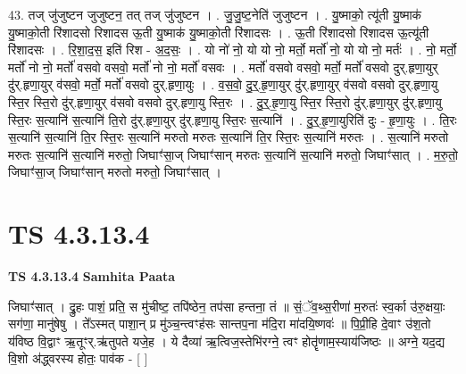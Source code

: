 \documentclass[17pt]{extarticle}
\begin{document}
43. तज् जु॑जुष्टन जुजुष्टन॒ तत् तज् जु॑जुष्टन । . जु॒जु॒ष्ट॒नेति॑ जुजुष्टन । . यु॒ष्माको॒ त्यू॑ती यु॒ष्माक॑ यु॒ष्माको॒ती रि॑शादसो रिशादस ऊ॒ती यु॒ष्माक॑ यु॒ष्माको॒ती रि॑शादसः । . ऊ॒ती रि॑शादसो रिशादस ऊ॒त्यू॑ती रि॑शादसः । . रि॒शा॒द॒स॒ इति॑ रिश - अ॒द॒सः॒ । . यो नो॑ नो॒ यो यो नो॒ मर्तो॒ मर्तो॑ नो॒ यो यो नो॒ मर्तः॑ । . नो॒ मर्तो॒ मर्तो॑ नो नो॒ मर्तो॑ वसवो वसवो॒ मर्तो॑ नो नो॒ मर्तो॑ वसवः । . मर्तो॑ वसवो वसवो॒ मर्तो॒ मर्तो॑ वसवो दुर्.हृणा॒युर् दु॑र्.हृणा॒युर् व॑सवो॒ मर्तो॒ मर्तो॑ वसवो दुर्.हृणा॒युः । . व॒स॒वो॒ दु॒र्॒.हृ॒णा॒युर् दु॑र्.हृणा॒युर् व॑सवो वसवो दुर्.हृणा॒यु स्ति॒र स्ति॒रो दु॑र्.हृणा॒युर् व॑सवो वसवो दुर्.हृणा॒यु स्ति॒रः । . दु॒र्॒.हृ॒णा॒यु स्ति॒र स्ति॒रो दु॑र्.हृणा॒युर् दु॑र्.हृणा॒यु स्ति॒रः स॒त्यानि॑ स॒त्यानि॑ ति॒रो दु॑र्.हृणा॒युर् दु॑र्.हृणा॒यु स्ति॒रः स॒त्यानि॑ । . दु॒र्॒.हृ॒णा॒युरिति॑ दुः - हृ॒णा॒युः । . ति॒रः स॒त्यानि॑ स॒त्यानि॑ ति॒र स्ति॒रः स॒त्यानि॑ मरुतो मरुतः स॒त्यानि॑ ति॒र स्ति॒रः स॒त्यानि॑ मरुतः । . स॒त्यानि॑ मरुतो मरुतः स॒त्यानि॑ स॒त्यानि॑ मरुतो॒ जिघाꣳ॑सा॒ज् जिघाꣳ॑सान् मरुतः स॒त्यानि॑ स॒त्यानि॑ मरुतो॒ जिघाꣳ॑सात् । . म॒रु॒तो॒ जिघाꣳ॑सा॒ज् जिघाꣳ॑सान् मरुतो मरुतो॒ जिघाꣳ॑सात् । \newline
\pagebreak
{}

\section{ TS 4.3.13.4 }

\textbf{TS 4.3.13.4 } \newline
\textbf{Samhita Paata} \newline

जिघाꣳ॑सात् । द्रु॒हः पाशं॒ प्रति॒ स मु॑चीष्ट॒ तपि॑ष्ठेन॒ तप॑सा हन्तना॒ तं ॥ सं॒ॅव॒थ्स॒रीणा॑ म॒रुतः॑ स्व॒र्का उ॑रु॒क्षयाः॒ सग॑णा॒ मानु॑षेषु । ते᳚ऽस्मत् पाशा॒न् प्र मु॑ञ्च॒न्त्वꣳह॑सः सान्तप॒ना म॑दि॒रा मा॑दयि॒ष्णवः॑ ॥ पि॒प्री॒हि दे॒वाꣳ उ॑श॒तो य॑विष्ठ वि॒द्वाꣳ ऋ॒तूꣳर्.ऋ॑तुपते यजे॒ह । ये दैव्या॑ ऋ॒त्विज॒स्तेभि॑रग्ने॒ त्वꣳ होतॄ॑णाम॒स्याय॑जिष्ठः ॥ अग्ने॒ यद॒द्य वि॒शो अ॑द्ध्वरस्य होतः॒ पाव॑क - [  ] \newline
\end{document}
